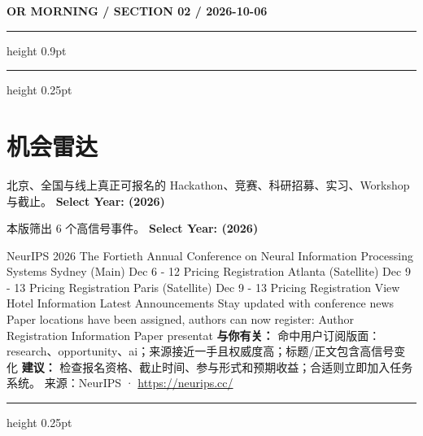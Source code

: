 \documentclass[10.5pt]{ctexart}
\begin{document}
\newpage
{\small\bfseries OR MORNING / SECTION 02 / 2026-10-06}
\vspace{2mm}
\hrule height 0.9pt
\vspace{1.5mm}
\hrule height 0.25pt
\vspace{4mm}
\section*{机会雷达}
{\color{ormuted} 北京、全国与线上真正可报名的 Hackathon、竞赛、科研招募、实习、Workshop 与截止。}
\vspace{2mm}
{\LARGE\bfseries Select Year: (2026)}\par
\vspace{1mm}
{\color{ormuted} 本版筛出 6 个高信号事件。}
\vspace{3mm}
{\Large\bfseries Select Year: (2026)}\par
NeurIPS 2026 The Fortieth Annual Conference on Neural Information Processing Systems Sydney (Main) Dec 6 - 12 Pricing Registration Atlanta (Satellite) Dec 9 - 13 Pricing Registration Paris (Satellite) Dec 9 - 13 Pricing Registration View Hotel Information Latest Announcements Stay updated with conference news Paper locations have been assigned, authors can now register: Author Registration Information Paper presentat
\textbf{与你有关：} 命中用户订阅版面：research、opportunity、ai；来源接近一手且权威度高；标题/正文包含高信号变化
\textbf{建议：} 检查报名资格、截止时间、参与形式和预期收益；合适则立即加入任务系统。
{\footnotesize\color{ormuted} 来源：NeurIPS · \url{https://neurips.cc/}}
\vspace{4mm}
\hrule height 0.25pt
\vspace{3mm}
\end{document}
